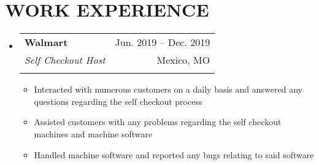 \documentclass[letterpaper,11pt]{article}
\makeatletter
\newcommand{\resumeItem}[1]{
  \item\small{
    {#1 \vspace{-1pt}}
  }
}
\newcommand{\resumeSubheading}[5]{
  \vspace{-1pt}\item
    \begin{tabular*}{\textwidth}[t]{l@{\extracolsep{\fill}}r}
      \textbf{#1} & {\color{dark-grey}\small #2}\vspace{1pt}\\ %
      \textit{#3} & {\color{dark-grey} \small #4}\vspace{1pt}\\ %
      & \color{dark-grey} \small #5
    \end{tabular*}\vspace{-20pt}
}
\newcommand{\resumeSubHeadingListStart}{\begin{itemize}[leftmargin=0in, label={}]}
\newcommand{\resumeSubHeadingListEnd}{\end{itemize}}
\newcommand{\resumeItemListStart}{\begin{itemize}\setlength{\itemindent}{-1em}}
\newcommand{\resumeItemListEnd}{\end{itemize}\vspace{0pt}}
\makeatother
\begin{document}
\section{WORK EXPERIENCE}
\resumeSubHeadingListStart
\resumeSubheading
{Walmart}{Jun. 2019 -- Dec. 2019}
{Self Checkout Host}{Mexico, MO}
{}
\resumeItemListStart
\resumeItem{Interacted with numerous customers on a daily basis and answered any questions regarding the self checkout process}
\resumeItem{Assisted customers with any problems regarding the self checkout machines and machine software}
\resumeItem{Handled machine software and reported any bugs relating to said software}
\resumeItemListEnd
\resumeSubHeadingListEnd
\end{document}
